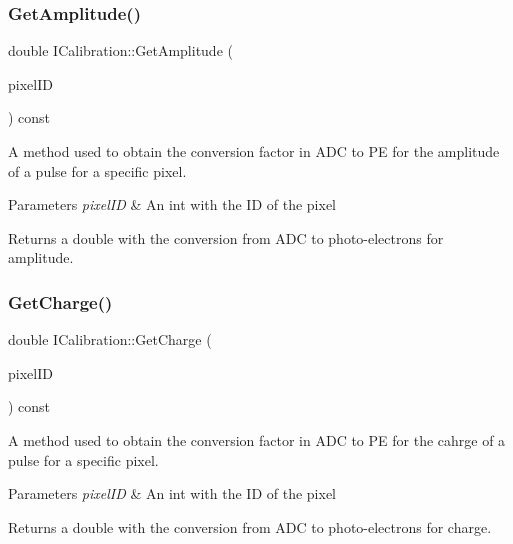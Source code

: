 \subsubsection{\texorpdfstring{Get\+Amplitude()}{GetAmplitude()}}
{\footnotesize\ttfamily double I\+Calibration\+::\+Get\+Amplitude (\begin{DoxyParamCaption}\item[{int}]{pixel\+ID }\end{DoxyParamCaption}) const}



A method used to obtain the conversion factor in A\+DC to PE for the amplitude of a pulse for a specific pixel. 


\begin{DoxyParams}{Parameters}
{\em pixel\+ID} & An int with the ID of the pixel\\
\hline
\end{DoxyParams}
\begin{DoxyReturn}{Returns}
a double with the conversion from A\+DC to photo-\/electrons for amplitude. 
\end{DoxyReturn}
\mbox{\label{classICalibration_a8f875ad909694df49d4cae6497f243e6}} 
\subsubsection{\texorpdfstring{Get\+Charge()}{GetCharge()}}
{\footnotesize\ttfamily double I\+Calibration\+::\+Get\+Charge (\begin{DoxyParamCaption}\item[{int}]{pixel\+ID }\end{DoxyParamCaption}) const}



A method used to obtain the conversion factor in A\+DC to PE for the cahrge of a pulse for a specific pixel. 


\begin{DoxyParams}{Parameters}
{\em pixel\+ID} & An int with the ID of the pixel\\
\hline
\end{DoxyParams}
\begin{DoxyReturn}{Returns}
a double with the conversion from A\+DC to photo-\/electrons for charge. 
\end{DoxyReturn}
\mbox{\label{classICalibration_a754365b6cc94bbec25a5cede2d245e9e}} 
